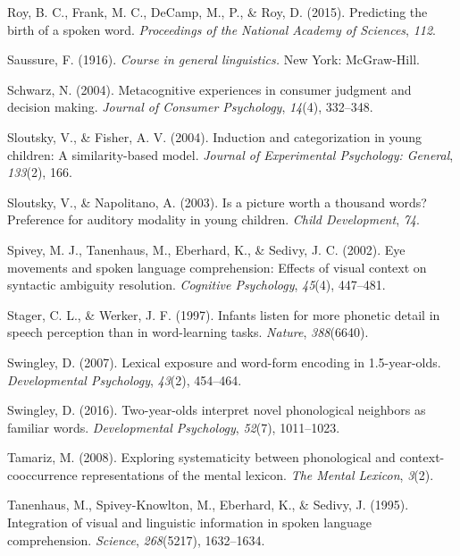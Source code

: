 \documentclass[english,floatsintext,man]{apa6}
\theoremstyle{definition}
\theoremstyle{definition}
\theoremstyle{definition}
\theoremstyle{remark}
\begin{document}
\hypertarget{ref-roy2015}{}
Roy, B. C., Frank, M. C., DeCamp, M., P., \& Roy, D. (2015). Predicting
the birth of a spoken word. \emph{Proceedings of the National Academy of
Sciences}, \emph{112}.

\hypertarget{ref-saussure1916}{}
Saussure, F. (1916). \emph{Course in general linguistics.} New York:
McGraw-Hill.

\hypertarget{ref-schwarz2004}{}
Schwarz, N. (2004). Metacognitive experiences in consumer judgment and
decision making. \emph{Journal of Consumer Psychology}, \emph{14}(4),
332--348.

\hypertarget{ref-sloutsky2004}{}
Sloutsky, V., \& Fisher, A. V. (2004). Induction and categorization in
young children: A similarity-based model. \emph{Journal of Experimental
Psychology: General}, \emph{133}(2), 166.

\hypertarget{ref-sloutsky2003}{}
Sloutsky, V., \& Napolitano, A. (2003). Is a picture worth a thousand
words? Preference for auditory modality in young children. \emph{Child
Development}, \emph{74}.

\hypertarget{ref-spivey2002}{}
Spivey, M. J., Tanenhaus, M., Eberhard, K., \& Sedivy, J. C. (2002). Eye
movements and spoken language comprehension: Effects of visual context
on syntactic ambiguity resolution. \emph{Cognitive Psychology},
\emph{45}(4), 447--481.

\hypertarget{ref-stager1997}{}
Stager, C. L., \& Werker, J. F. (1997). Infants listen for more phonetic
detail in speech perception than in word-learning tasks. \emph{Nature},
\emph{388}(6640).

\hypertarget{ref-Swingley2007}{}
Swingley, D. (2007). Lexical exposure and word-form encoding in
1.5-year-olds. \emph{Developmental Psychology}, \emph{43}(2), 454--464.

\hypertarget{ref-Swingley2016}{}
Swingley, D. (2016). Two-year-olds interpret novel phonological
neighbors as familiar words. \emph{Developmental Psychology},
\emph{52}(7), 1011--1023.

\hypertarget{ref-Tamariz2008}{}
Tamariz, M. (2008). Exploring systematicity between phonological and
context-cooccurrence representations of the mental lexicon. \emph{The
Mental Lexicon}, \emph{3}(2).

\hypertarget{ref-Tanenhaus1995}{}
Tanenhaus, M., Spivey-Knowlton, M., Eberhard, K., \& Sedivy, J. (1995).
Integration of visual and linguistic information in spoken language
comprehension. \emph{Science}, \emph{268}(5217), 1632--1634.
\end{document}
